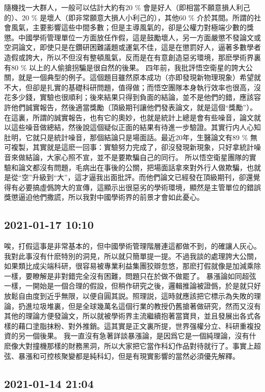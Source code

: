 \documentclass[twocolumn]{ctexart}
\begin{document}
隨機找一大群人，一般可以估計大約有20 \% 會是好人（即相當不願意損人利己的）、20 \% 是壞人（即非常願意大損人小利己的），其他60 \% 介於其間。所謂的社會風氣，主要影響這些中間多數；但是主導風氣的，卻是公權力對極端少數的獎懲。中國學術管理單位一方面放任作假，這是鼓勵壞人，另一方面嚴懲不發論文或空洞論文，即使只是在鑽研困難議題或運氣不佳，這是在懲罰好人，逼著多數學者造假或誇大，所以不但沒有整頓風氣，反而是在有意創造惡劣環境，那麽學術界裏有80 \% 以上的人偷搶拐騙是很自然的後果。
四年前，我批評悟空衛星的誇大公關，就是一個典型的例子。這個題目雖然原本成功（亦即發現新物理現象）希望就不大，但卻是扎實的基礎科研問題，值得做；而悟空團隊本身執行效率也很高，沒花多少錢，實驗也很順利；後來結果只得到負面的結論，並不是他們的錯，應該容許他們誠實報告，然後適當獎勵（頂級期刊讓他們發表論文，就是這個“獎勵”）。在這裏，所謂的誠實報告，也有它的奧妙，也就是統計上總是會有些噪音，論文就以這些噪音做總結，然後說這個疑似正面的結果有待進一步驗證。其實行内人心知肚明，它就只是統計噪音，那個結論只是場面話。最近20年，生醫論文有89 \% 無可複製，其實就是這麽一回事：實驗努力完成了，卻沒發現新現象，只好拿統計噪音來做結論，大家心照不宣，並不是要欺騙自己的同行。
所以悟空衛星團隊的實驗和論文都沒有問題，毛病出在事後的公關，把場面話拿來對外行人做欺騙，也就是從“空”升級到“大”，這才逼我出面批評。而他們論文已經發在頂級期刊，卻還覺得有必要搞虛僞誇大的宣傳，這顯示出很惡劣的學術環境，顯然是主管單位的錯誤獎懲逼迫他們撒謊，所以我對中國學術界的前景才會如此憂心。
\subsection*{2021-01-17 10:10}

唉，打假這事是非常基本的，但中國學術管理階層連這都做不到，的確讓人灰心。我對此事沒有什麽特別的洞見，所以就只簡單提一提。不過我談的處理誇大公關，如果類比成尖端科研，很容易被專業利益集團狡辯忽悠，那麽打假就像是加減乘除一樣，要瞭解是非對錯完全沒有困難，問題只在於做不做罷了。
暴漲論如同超弦一樣，一開始是一個合理的假設，但稍作研究之後，邏輯推論被證僞，於是就只好放鬆自由度到近乎無限，以便自圓其説。照理説，這時就應該把它標示為失敗的理論，扔進垃圾堆裏，但是全球幾萬名這個行業的教授仍舊搶著做研究，然而又沒有其他的理論方便發論文，所以就被學術界主流繼續抱著當寶貝，並且發展出各式各樣的藉口塗脂抹粉、對外推銷。這其實是正文裏所提，世界强權分立、科研重複投資的另一個後果。
我一直沒有急著詳談暴漲論，是因爲它是一個純理論，沒有什麽像大對撞機那樣的財務黑洞，所以大家把它當作科幻作品對待就行了。事實上超弦、暴漲和可控核聚變都是純科幻，但是有現實影響的當然必須優先解釋。
\subsection*{2021-01-14 21:04}
\end{document}
